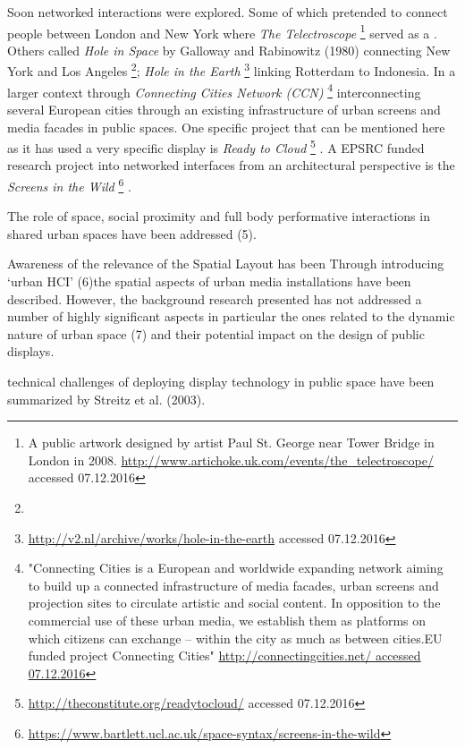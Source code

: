 Soon networked interactions were explored. 
Some of which pretended to connect people between London and New York where  \textit{The Telectroscope} \footnote{A public artwork designed by artist Paul St. George near Tower Bridge in London in 2008. \url{http://www.artichoke.uk.com/events/the_telectroscope/} accessed 07.12.2016} served as a . Others called \textit{Hole in Space} by Galloway and Rabinowitz (1980)  connecting New York and Los Angeles \footnote{}; \textit{Hole in the Earth}  \footnote{\url{http://v2.nl/archive/works/hole-in-the-earth} accessed 07.12.2016} linking Rotterdam to Indonesia.
In a larger context through  \textit{Connecting Cities Network (CCN)} \footnote{"Connecting Cities is a European and worldwide expanding network aiming to build up a connected infrastructure of media facades, urban screens and projection sites to circulate artistic and social content. 
In opposition to the commercial use of these urban media, we establish them as platforms on which citizens can exchange – within the city as much as between cities.EU funded project Connecting Cities" \url{http://connectingcities.net/ accessed 07.12.2016}} interconnecting several European cities through an existing infrastructure of urban screens and media facades in public spaces.
One specific project that can be mentioned here as it has used a very specific display is \textit{Ready to Cloud} \footnote{\url{http://theconstitute.org/readytocloud/} accessed 07.12.2016} . 
A EPSRC funded research project into networked interfaces from an architectural perspective is the \textit{Screens in the Wild} \footnote{\url{https://www.bartlett.ucl.ac.uk/space-syntax/screens-in-the-wild}} .


The role of space, social proximity and full body performative interactions in shared urban spaces have been addressed (5). 

Awareness of the relevance of the Spatial Layout has been 
Through introducing ‘urban HCI’  (6)the spatial aspects of urban media installations have been described. 
However, the background research presented has not addressed a number of highly significant aspects in particular the ones related to the dynamic nature of urban space (7) and their potential impact on the design of public displays. 

technical challenges of deploying display
technology in public space have been summarized by Streitz et al. (2003).

